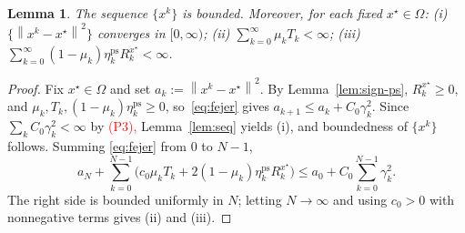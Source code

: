 \documentclass[]{interact}
\theoremstyle{plain}
\newtheorem{lemma}[theorem]{Lemma}
\theoremstyle{definition}
\theoremstyle{remark}
\newcommand{\norm}[1]{\left\lVert #1 \right\rVert}
\newcommand{\ps}{\mathrm{ps}}
\begin{document}
\begin{lemma}\label{lem:bounded}
The sequence $\{x^k\}$ is bounded. Moreover, for each fixed $x^\star\in\Omega$: \textup{(i)} $\{\norm{x^k-x^\star}^2\}$ converges in $[0,\infty)$; \textup{(ii)} $\sum_{k=0}^\infty\mu_k T_k<\infty$; \textup{(iii)} $\sum_{k=0}^\infty(1-\mu_k)\eta^{\ps}_k R^{x^\star}_k<\infty$.
\end{lemma}
\begin{proof}
Fix $x^\star\in\Omega$ and set $a_k:=\norm{x^k-x^\star}^2$. By Lemma~\ref{lem:sign-ps}, $R^{x^\star}_k\ge0$, and $\mu_k,T_k,(1-\mu_k)\eta^{\ps}_k\ge0$, so~\eqref{eq:fejer} gives $a_{k+1}\le a_k+C_0\gamma_k^2$. Since $\sum_k C_0\gamma_k^2<\infty$ by \leavevmode\textcolor{red}{(P3),} Lemma~\ref{lem:seq} yields (i), and boundedness of $\{x^k\}$ follows. Summing \eqref{eq:fejer} from $0$ to $N-1$,
\[
a_N+\sum_{k=0}^{N-1}\bigl(c_0\mu_k T_k+2(1-\mu_k)\eta^{\ps}_k R^{x^\star}_k\bigr)\le a_0+C_0\sum_{k=0}^{N-1}\gamma_k^2 .
\]
The right side is bounded uniformly in $N$; letting $N\to\infty$ and using $c_0>0$ with nonnegative terms gives (ii) and (iii).
\end{proof}
\end{document}
